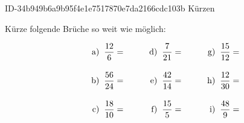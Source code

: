 \begin{exercise}
      {ID-34b949b6a9b95f4e1e7517870e7da2166cdc103b}
      {Kürzen}
  \ifproblem\problem\par
    Kürze folgende Brüche so weit wie möglich:
    \newcommand{\no}[1]
    {%
      \vphantom{\Bigg(}%
      \makebox[3em][r]%
      {%
        #1)%
      }%
      \;\;&%
    }%
    \begin{align*}
      \no{a} \frac{12}{6}=  & \no{d} \frac{7}{21}=  & \no{g} \frac{15}{12}= \\
      \no{b} \frac{56}{24}= & \no{e} \frac{42}{14}= & \no{h} \frac{12}{30}= \\
      \no{c} \frac{18}{10}= & \no{f} \frac{15}{5}=  & \no{i} \frac{48}{9}=
    \end{align*}
  \fi
\end{exercise}

